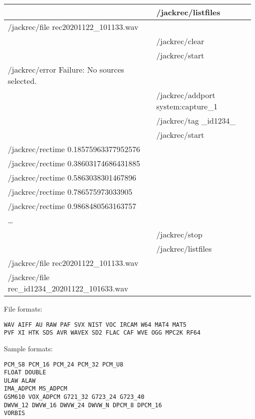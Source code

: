 \begin{tabular}{|l|l|}
  \hline
                                                  & /jackrec/listfiles                 \\
  \hline
  /jackrec/file rec20201122\_101133.wav           &                                    \\
  \hline
  \hline
                                                  & /jackrec/clear                     \\
                                                  & /jackrec/start                     \\
  \hline
   /jackrec/error Failure: No sources selected.   &                                    \\
  \hline
  \hline
                                                  & /jackrec/addport system:capture\_1 \\
                                                  & /jackrec/tag \_id1234\_            \\
                                                  & /jackrec/start                     \\
  \hline
  /jackrec/rectime 0.18575963377952576            &                                    \\
  /jackrec/rectime 0.38603174686431885            &                                    \\
  /jackrec/rectime 0.5863038301467896             &                                    \\
  /jackrec/rectime 0.786575973033905              &                                    \\
  /jackrec/rectime 0.9868480563163757             &                                    \\
  \dots                                           &                                    \\
  \hline
                                                  & /jackrec/stop                      \\
  \hline
                                                  & /jackrec/listfiles                 \\
  \hline
  /jackrec/file rec20201122\_101133.wav           &                                    \\
  /jackrec/file rec\_id1234\_20201122\_101633.wav &                                    \\
  \hline
\end{tabular}

File formats:
\begin{verbatim}
WAV AIFF AU RAW PAF SVX NIST VOC IRCAM W64 MAT4 MAT5
PVF XI HTK SDS AVR WAVEX SD2 FLAC CAF WVE OGG MPC2K RF64
\end{verbatim}

Sample formats:
\begin{verbatim}
PCM_S8 PCM_16 PCM_24 PCM_32 PCM_U8
FLOAT DOUBLE
ULAW ALAW
IMA_ADPCM MS_ADPCM
GSM610 VOX_ADPCM G721_32 G723_24 G723_40
DWVW_12 DWVW_16 DWVW_24 DWVW_N DPCM_8 DPCM_16
VORBIS
\end{verbatim}
